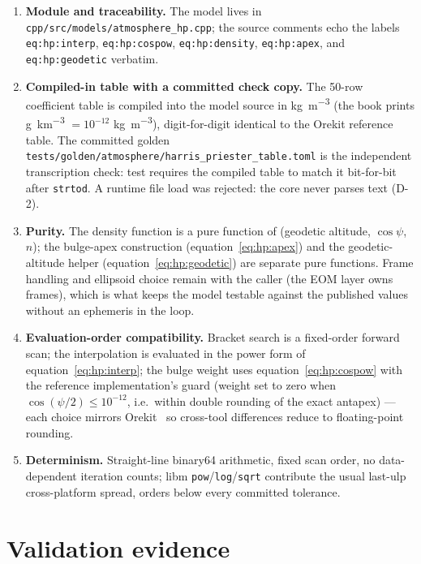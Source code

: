 \begin{enumerate}
  \item \textbf{Module and traceability.} The model lives in
    \texttt{cpp/src/models/atmosphere\_hp.cpp}; the source comments echo
    the labels \texttt{eq:hp:interp}, \texttt{eq:hp:cospow},
    \texttt{eq:hp:density}, \texttt{eq:hp:apex}, and
    \texttt{eq:hp:geodetic} verbatim.
  \item \textbf{Compiled-in table with a committed check copy.} The
    50-row coefficient table is compiled into the model source in
    \unit{\kilogram\per\metre\cubed} (the book prints
    \unit{\gram\per\kilo\metre\cubed} $= 10^{-12}$
    \unit{\kilogram\per\metre\cubed}), digit-for-digit identical to the
    Orekit reference table. The committed golden
    \texttt{tests/golden/atmosphere/harris\_priester\_table.toml} is the
    independent transcription check: test  requires
    the compiled table to match it bit-for-bit after \texttt{strtod}. A
    runtime file load was rejected: the core never parses text (D-2).
  \item \textbf{Purity.} The density function is a pure function of
    (geodetic altitude, $\cos\psi$, $n$); the bulge-apex construction
    (equation~\eqref{eq:hp:apex}) and the geodetic-altitude helper
    (equation~\eqref{eq:hp:geodetic}) are separate pure functions. Frame
    handling and ellipsoid choice remain with the caller (the EOM layer
    owns frames), which is what keeps the model testable against the
    published values without an ephemeris in the loop.
  \item \textbf{Evaluation-order compatibility.} Bracket search is a
    fixed-order forward scan; the interpolation is evaluated in the power
    form of equation~\eqref{eq:hp:interp}; the bulge weight uses
    equation~\eqref{eq:hp:cospow} with the reference implementation's
    guard (weight set to zero when $\cos(\psi/2) \le 10^{-12}$, i.e.\
    within double rounding of the exact antapex) --- each choice mirrors
    Orekit~\cite{orekithp} so cross-tool differences reduce to
    floating-point rounding.
  \item \textbf{Determinism.} Straight-line binary64 arithmetic, fixed
    scan order, no data-dependent iteration counts; libm
    \texttt{pow}/\texttt{log}/\texttt{sqrt} contribute the usual
    last-ulp cross-platform spread, orders below every committed
    tolerance.
\end{enumerate}

\section{Validation evidence}
\label{sec:hp:validation}

